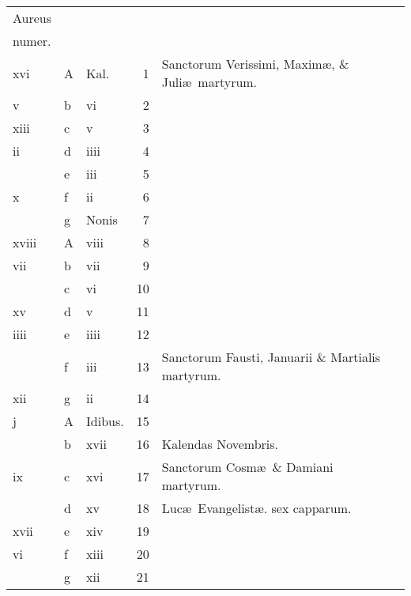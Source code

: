 \documentclass[openany]{book}
\begin{document}
\begin{center}
\begin{tabular}{l | l | l | r | l r}
\color{Red}Aureus & & & & \color{Red} \\
\color{Red}numer. & & & & \color{Red} \\
\color{Red} xvi & \color{Red} A & \color{Red} Kal. & 1 & Sanctorum Verissimi, Maxim\ae , \& Juli\ae \ martyrum. & \color{Red} \\
\color{Red} v & b & \color{Red} vi & 2 & & \color{Red} \\
\color{Red} xiii & c & \color{Red} v & 3 & & \color{Red} \\
\color{Red} ii & d & \color{Red} iiii & 4 & & \color{Red} \\
\color{Red}  & e & \color{Red} iii & 5 & & \color{Red} \\
\color{Red} x & f & \color{Red} ii & 6 & & \color{Red} \\
\color{Red}  & g & Nonis & 7 & & \color{Red} \\
\color{Red} xviii & \color{Red} A & \color{Red} viii & 8 & & \color{Red} \\
\color{Red} vii & b & \color{Red} vii & 9 & & \color{Red} \\
\color{Red}  & c & \color{Red} vi & 10 & & \color{Red} \\
\color{Red} xv & d & \color{Red} v & 11 & & \color{Red} \\
\color{Red} iiii & e & \color{Red} iiii & 12 & & \color{Red} \\
\color{Red}  & f & \color{Red} iii & 13 & Sanctorum Fausti, Januarii \& Martialis martyrum. & \color{Red} \\
\color{Red} xii & g & \color{Red} ii & 14 & & \color{Red} \\
\color{Red} j & \color{Red} A & Idibus. & 15 & & \color{Red} \\
\color{Red}  & b & \color{Red} xvii & 16 & \qquad \color{Red} Kalendas Novembris. & \color{Red} \\
\color{Red} ix & c & \color{Red} xvi & 17 & Sanctorum Cosm\ae \ \& Damiani martyrum. & \color{Red} \\
\color{Red}  & d & \color{Red} xv & 18 & \color{Red} Luc\ae \ Evangelist\ae . \color{black} sex capparum. & \color{Red} \\
\color{Red} xvii & e & \color{Red} xiv & 19 & & \color{Red} \\
\color{Red} vi & f & \color{Red} xiii & 20 & & \color{Red} \\
\color{Red}  & g & \color{Red} xii & 21 & & \color{Red} \\

\end{tabular}
\end{center}
\end{document}

